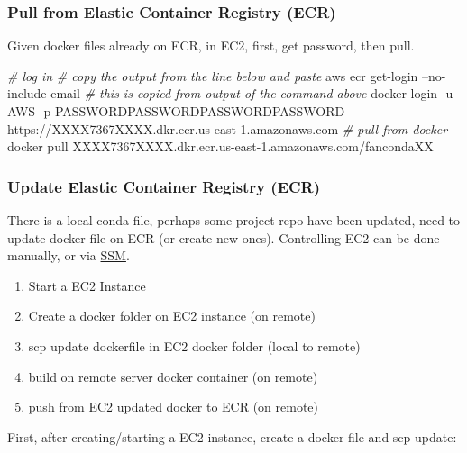 \documentclass[
]{book}
\newenvironment{Shaded}{\begin{snugshade}}{\end{snugshade}}
\newcommand{\CommentTok}[1]{\textcolor[rgb]{0.56,0.35,0.01}{\textit{#1}}}
\newcommand{\ExtensionTok}[1]{#1}
\newcommand{\NormalTok}[1]{#1}
\providecommand{\tightlist}{%
  \setlength{\itemsep}{0pt}\setlength{\parskip}{0pt}}
\begin{document}
\hypertarget{pull-from-elastic-container-registry-ecr}{%
\subsubsection{Pull from Elastic Container Registry (ECR)}\label{pull-from-elastic-container-registry-ecr}}

Given docker files already on ECR, in EC2, first, get password, then pull.

\begin{Shaded}
\begin{Highlighting}[]
\CommentTok{# log in}
\CommentTok{# copy the output from the line below and paste}
\ExtensionTok{aws}\NormalTok{ ecr get-login --no-include-email}
\CommentTok{# this is copied from output of the command above}
\ExtensionTok{docker}\NormalTok{ login -u AWS -p PASSWORDPASSWORDPASSWORDPASSWORD https://XXXX7367XXXX.dkr.ecr.us-east-1.amazonaws.com}
\CommentTok{# pull from docker}
\ExtensionTok{docker}\NormalTok{ pull XXXX7367XXXX.dkr.ecr.us-east-1.amazonaws.com/fancondaXX}
\end{Highlighting}
\end{Shaded}

\hypertarget{update-elastic-container-registry-ecr}{%
\subsubsection{Update Elastic Container Registry (ECR)}\label{update-elastic-container-registry-ecr}}

There is a local conda file, perhaps some project repo have been updated, need to update docker file on ECR (or create new ones). Controlling EC2 can be done manually, or via \href{https://docs.aws.amazon.com/systems-manager/latest/userguide/prereqs-ssm-agent.html}{SSM}.

\begin{enumerate}
\def\labelenumi{\arabic{enumi}.}
\tightlist
\item
  Start a EC2 Instance
\item
  Create a docker folder on EC2 instance (on remote)
\item
  scp update dockerfile in EC2 docker folder (local to remote)
\item
  build on remote server docker container (on remote)
\item
  push from EC2 updated docker to ECR (on remote)
\end{enumerate}

First, after creating/starting a EC2 instance, create a docker file and scp update:
\end{document}
